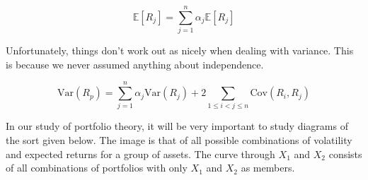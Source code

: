 \documentclass{ximera}
\begin{document}
\begin{equation*}
\mathbb{E}[R_j]=\sum_{j=1}^n\alpha_j\mathbb{E}[R_j]
\end{equation*}

Unfortunately, things don't work out as nicely when dealing with variance. This is because we never assumed anything about independence. 

\begin{equation*}
\text{Var}(R_p)=\sum_{j=1}^n\alpha_j\text{Var}(R_j)+2\sum_{1\leq i< j\leq n}\text{Cov}(R_i, R_j)
\end{equation*}

In our study of portfolio theory, it will be very important to study diagrams of the sort given below. The image is that of all possible combinations of volatility and expected returns for a group of assets. The curve through $X_1$ and $X_2$ consists of all combinations of portfolios with only $X_1$ and $X_2$ as members. 
\end{document}

